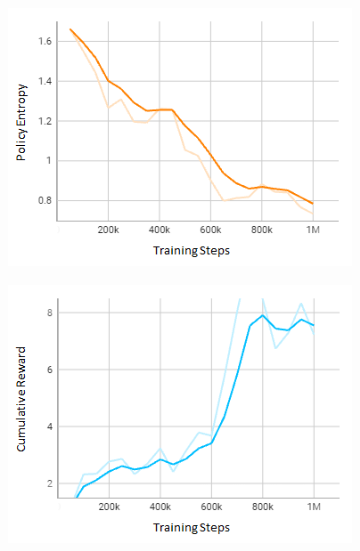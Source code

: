 \documentclass[letterpaper, 10 pt, conference]{ieeeconf}  %
\begin{document}
\begin{figure}[t]
\begin{subfigure}[b]{0.16\linewidth}
         \includegraphics[width=\linewidth]{Fig5c.png}
         \caption{}
         \label{fig5c}
     \end{subfigure}
     \hfill
     \begin{subfigure}[b]{0.16\linewidth}
         \centering
         \includegraphics[width=\linewidth]{Fig5d.png}
         \caption{}
         \label{fig5d}
     \end{subfigure}
     \hfill
     \begin{subfigure}[b]{0.16\linewidth}
         \centering

\end{subfigure}
\end{figure}
\end{document}
